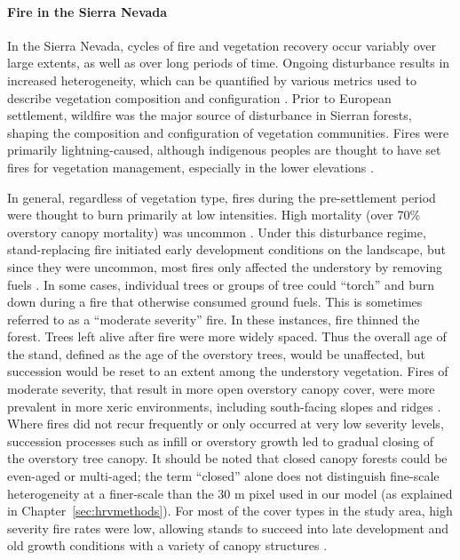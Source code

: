 \paragraph{Fire in the Sierra Nevada}
In the Sierra Nevada, cycles of fire and vegetation recovery occur variably over large extents, as well as over long periods of time. Ongoing disturbance results in increased heterogeneity, which can be quantified by various metrics used to describe vegetation composition and configuration \citep{Monica2008}. Prior to European settlement, wildfire was the major source of disturbance in Sierran forests, shaping the composition and configuration of vegetation communities. Fires were primarily lightning-caused, although indigenous peoples are thought to have set fires for vegetation management, especially in the lower elevations \citep{Safford2013}. 

In general, regardless of vegetation type, fires during the pre-settlement period were thought to burn primarily at low intensities. High mortality (over 70\% overstory canopy mortality) was uncommon \citep{Skinner1996, SNEP1996a,Mallek2013}. Under this disturbance regime, stand-replacing fire initiated early development conditions on the landscape, but since they were uncommon, most fires only affected the understory by removing fuels \citep{Skinner1996, SNEP1996a,Mallek2013}. In some cases, individual trees or groups of tree could ``torch'' and burn down during a fire that otherwise consumed ground fuels. This is sometimes referred to as a ``moderate severity'' fire. In these instances, fire thinned the forest. Trees left alive after fire were more widely spaced. Thus the overall age of the stand, defined as the age of the overstory trees, would be unaffected, but succession would be reset to an extent among the understory vegetation. Fires of moderate severity, that result in more open overstory canopy cover, were more prevalent in more xeric environments, including south-facing slopes and ridges \citep{Mallek2013,Safford2014,SNEP1996a,SNEP1996}. Where fires did not recur frequently or only occurred at very low severity levels, succession processes such as infill or overstory growth led to gradual closing of the overstory tree canopy. It should be noted that closed canopy forests could be even-aged or multi-aged; the term ``closed'' alone does not distinguish fine-scale heterogeneity at a finer-scale than the 30 m pixel used in our model (as explained in Chapter~\ref{sec:hrvmethods}). For most of the cover types in the study area, high severity fire rates were low, allowing stands to succeed into late development and old growth conditions with a variety of canopy structures \citep{Mallek2013,Safford2014,SNEP1996a,SNEP1996}. 

